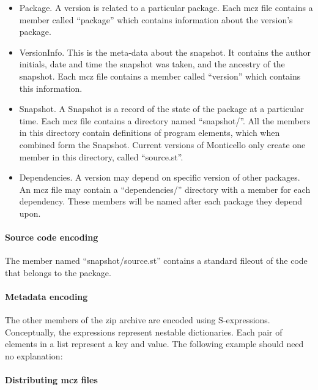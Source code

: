 \documentclass[a4paper,10pt,twoside]{book}
\begin{document}
\begin{itemize}
\item Package. A version is related to a particular package. Each mcz file contains a member called ``package'' which contains information about the version's package.

\item VersionInfo. This is the meta-data about the snapshot. It contains the author initials, date and time the snapshot was taken, and the ancestry of the snapshot. Each mcz file contains a member called ``version'' which contains this information.
\item Snapshot. A Snapshot is a record of the state of the package at a particular time. Each mcz file contains a directory named ``snapshot/''. All the members in this directory contain definitions of program elements, which when combined form the Snapshot. Current versions of Monticello only create one member in this directory, called ``source.st''.
\item Dependencies. A version may depend on specific version of other packages. An mcz file may contain a ``dependencies/'' directory with a member for each dependency. These members will be named after each package they  depend upon.
\end{itemize}

\paragraph{Source code encoding}

The member named ``snapshot/source.st'' contains a standard fileout of the code that belongs to the package.

\paragraph{Metadata encoding}

The other members of the zip archive are encoded using S-expressions. Conceptually, the expressions represent nestable dictionaries. Each pair of elements in a list represent a key and value. The following example should need no explanation: 


\paragraph{Distributing mcz files}
\end{document}
